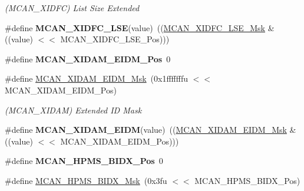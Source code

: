 \begin{DoxyCompactItemize}
\begin{DoxyCompactList}\small\item\em (M\+C\+A\+N\+\_\+\+X\+I\+D\+FC) List Size Extended \end{DoxyCompactList}\item 
\mbox{\label{group__SAME70__MCAN_ga6828b9bb807fed9aa3f8a9549db6e3b9}} 
\#define {\bfseries M\+C\+A\+N\+\_\+\+X\+I\+D\+F\+C\+\_\+\+L\+SE}(value)~((\mbox{\hyperlink{group__SAMV71__MCAN_gae97ae0b9da3a0dd490be81db3eece809}{M\+C\+A\+N\+\_\+\+X\+I\+D\+F\+C\+\_\+\+L\+S\+E\+\_\+\+Msk}} \& ((value) $<$$<$ M\+C\+A\+N\+\_\+\+X\+I\+D\+F\+C\+\_\+\+L\+S\+E\+\_\+\+Pos)))
\item 
\mbox{\label{group__SAME70__MCAN_ga7561b9f2f00a8475332b6c6b7294680c}} 
\#define {\bfseries M\+C\+A\+N\+\_\+\+X\+I\+D\+A\+M\+\_\+\+E\+I\+D\+M\+\_\+\+Pos}~0
\item 
\mbox{\label{group__SAME70__MCAN_gafa77f6b4776e8c20016b1b1293f02176}} 
\#define \mbox{\hyperlink{group__SAME70__MCAN_gafa77f6b4776e8c20016b1b1293f02176}{M\+C\+A\+N\+\_\+\+X\+I\+D\+A\+M\+\_\+\+E\+I\+D\+M\+\_\+\+Msk}}~(0x1fffffffu $<$$<$ M\+C\+A\+N\+\_\+\+X\+I\+D\+A\+M\+\_\+\+E\+I\+D\+M\+\_\+\+Pos)
\begin{DoxyCompactList}\small\item\em (M\+C\+A\+N\+\_\+\+X\+I\+D\+AM) Extended ID Mask \end{DoxyCompactList}\item 
\mbox{\label{group__SAME70__MCAN_ga6c1cc6ad970bcea416d60f22f4ff413c}} 
\#define {\bfseries M\+C\+A\+N\+\_\+\+X\+I\+D\+A\+M\+\_\+\+E\+I\+DM}(value)~((\mbox{\hyperlink{group__SAMV71__MCAN_gafa77f6b4776e8c20016b1b1293f02176}{M\+C\+A\+N\+\_\+\+X\+I\+D\+A\+M\+\_\+\+E\+I\+D\+M\+\_\+\+Msk}} \& ((value) $<$$<$ M\+C\+A\+N\+\_\+\+X\+I\+D\+A\+M\+\_\+\+E\+I\+D\+M\+\_\+\+Pos)))
\item 
\mbox{\label{group__SAME70__MCAN_ga8a53a49e147fe508762c1a2ff222999f}} 
\#define {\bfseries M\+C\+A\+N\+\_\+\+H\+P\+M\+S\+\_\+\+B\+I\+D\+X\+\_\+\+Pos}~0
\item 
\mbox{\label{group__SAME70__MCAN_ga01efa314ddc18c7c9e4d0b0fdeed5508}} 
\#define \mbox{\hyperlink{group__SAME70__MCAN_ga01efa314ddc18c7c9e4d0b0fdeed5508}{M\+C\+A\+N\+\_\+\+H\+P\+M\+S\+\_\+\+B\+I\+D\+X\+\_\+\+Msk}}~(0x3fu $<$$<$ M\+C\+A\+N\+\_\+\+H\+P\+M\+S\+\_\+\+B\+I\+D\+X\+\_\+\+Pos)

\end{DoxyCompactItemize}
